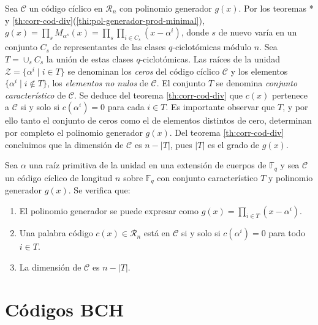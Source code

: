 Sea \(\mathcal C\) un código cíclico en \(\mathcal R_n\) con polinomio generador \(g(x)\).
Por los teoremas * y \ref{th:corr-cod-div}(\ref{thi:pol-generador-prod-minimal}), \(g(x) = \prod_{s}M_{\alpha^s}(x) = \prod_s\prod_{i \in C_s}(x - \alpha^{i})\), donde \(s\) de nuevo varía en un conjunto \(C_s\) de representantes de las clases \(q\)-ciclotómicas módulo \(n\).
Sea \(T = \cup_s C_s\) la unión de estas clases \(q\)-ciclotómicas.
Las raíces de la unidad \(\mathcal Z = \{\alpha^{i} \mid i \in T\}\) se denominan los \textit{ceros} del código cíclico \(\mathcal C\) y los elementos \(\{\alpha^{i} \mid i \notin T\}\), los \textit{elementos no nulos} de \(\mathcal C\).
El conjunto \(T\) se denomina \textit{conjunto característico} de \(\mathcal C\).
Se deduce del teorema \ref{th:corr-cod-div} que \(c(x)\) pertenece a \(\mathcal C\) si y solo si \(c(\alpha^{i}) = 0\) para cada \(i \in T\).
Es importante observar que \(T\), y por ello tanto el conjunto de ceros como el de elementos distintos de cero, determinan por completo el polinomio generador \(g(x)\).
Del teorema \ref{th:corr-cod-div} concluimos que la dimensión de \(\mathcal C\) es \(n - |T|\), pues \(|T|\) es el grado de \(g(x)\).


\begin{theorem}
  \label{th:cicl-cto-caracteristico}
  Sea \(\alpha\) una raíz primitiva de la unidad en una extensión de cuerpos de \(\mathbb F_q\) y sea \(\mathcal C\) un código cíclico de longitud \(n\) sobre \(\mathbb F_q\) con conjunto característico \(T\) y polinomio generador \(g(x)\).
  Se verifica que: \begin{enumerate}
    \item El polinomio generador se puede expresar como \(g(x) = \prod_{i \in T}(x - \alpha^i)\).
    \item Una palabra código \(c(x) \in \mathcal R_n\) está en \(\mathcal C\) si y solo si \(c(\alpha^i) = 0\) para todo \(i \in T\).
    \item La dimensión de \(\mathcal C\) es \(n - |T|\).
  \end{enumerate}
\end{theorem}


\section{Códigos BCH}

